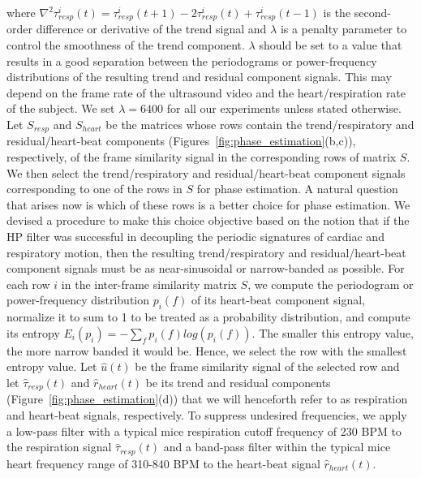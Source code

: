 \documentclass[journal]{IEEEtran}
\begin{document}
where $\nabla^2\tau^i_{resp}(t) = \tau^i_{resp}(t+1) - 2 \tau^i_{resp}(t) + \tau^i_{resp}(t-1)$ is the second-order difference or derivative of the trend signal and $\lambda$ is a penalty parameter to control the smoothness of the trend component. $\lambda$ should be set to a value that results in a good separation between the periodograms or power-frequency distributions of the resulting trend and residual component signals. This may depend on the frame rate of the ultrasound video and the heart/respiration rate of the subject. We set $\lambda=6400$ for all our experiments unless stated otherwise. Let $S_{resp}$ and $S_{heart}$ be the matrices whose rows contain the trend/respiratory and residual/heart-beat components (Figures~\ref{fig:phase_estimation}(b,c)), respectively, of the frame similarity signal in the corresponding rows of matrix $S$. We then select the trend/respiratory and residual/heart-beat component signals corresponding to one of the rows in $S$ for phase estimation. A natural question that arises now is which of these rows is a better choice for phase estimation. We devised a procedure to make this choice objective based on the notion that if the HP filter was successful in decoupling the periodic signatures of cardiac and respiratory motion, then the resulting trend/respiratory and residual/heart-beat component signals must be as near-sinusoidal or narrow-banded as possible. For each row $i$ in the inter-frame similarity matrix $S$, we compute the periodogram or power-frequency distribution $p_i(f)$ of its heart-beat component signal, normalize it to sum to 1 to be treated as a probability distribution, and compute its entropy $E_i(p_i)=-\sum_{f} p_i(f) log(p_i(f))$. The smaller this entropy value, the more narrow banded it would be. Hence, we select the row with the smallest entropy value. Let $\hat{u}(t)$ be the frame similarity signal of the selected row and let $\hat{\tau}_{resp}(t)$ and $\hat{r}_{heart}(t)$  be its trend and residual components  (Figure~\ref{fig:phase_estimation}(d)) that we will henceforth refer to as respiration and heart-beat signals, respectively. To suppress undesired frequencies, we apply a low-pass filter with a typical mice respiration cutoff frequency of 230 BPM to the respiration signal $\hat{\tau}_{resp}(t)$ and a band-pass filter within the typical mice heart frequency range of 310-840 BPM to the heart-beat signal $\hat{r}_{heart}(t)$. 
\end{document}
